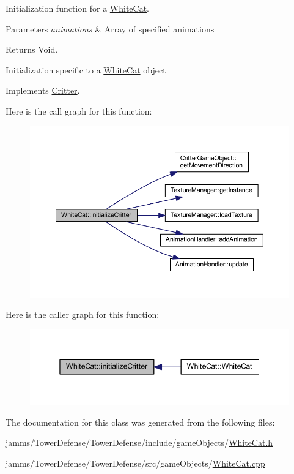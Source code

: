 Initialization function for a \hyperlink{class_white_cat}{White\+Cat}. 


\begin{DoxyParams}{Parameters}
{\em animations} & Array of specified animations \\
\hline
\end{DoxyParams}
\begin{DoxyReturn}{Returns}
Void.
\end{DoxyReturn}
Initialization specific to a \hyperlink{class_white_cat}{White\+Cat} object 

Implements \hyperlink{class_critter_ad425da71f01445ee175e5f98d94ca0ba}{Critter}.



Here is the call graph for this function\+:
\nopagebreak
\begin{figure}[H]
\begin{center}
\leavevmode
\includegraphics[width=350pt]{class_white_cat_a0a3c801e7a6b451b2b1caef9da137585_cgraph}
\end{center}
\end{figure}




Here is the caller graph for this function\+:\nopagebreak
\begin{figure}[H]
\begin{center}
\leavevmode
\includegraphics[width=345pt]{class_white_cat_a0a3c801e7a6b451b2b1caef9da137585_icgraph}
\end{center}
\end{figure}




The documentation for this class was generated from the following files\+:\begin{DoxyCompactItemize}
\item 
jamms/\+Tower\+Defense/\+Tower\+Defense/include/game\+Objects/\hyperlink{_white_cat_8h}{White\+Cat.\+h}\item 
jamms/\+Tower\+Defense/\+Tower\+Defense/src/game\+Objects/\hyperlink{_white_cat_8cpp}{White\+Cat.\+cpp}\end{DoxyCompactItemize}
